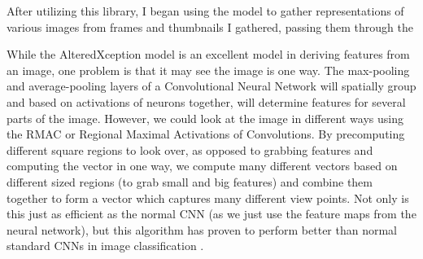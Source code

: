 \documentclass[10pt,twocolumn]{article}
\begin{document}
After utilizing this library, I began using the model to gather representations of various images from frames and thumbnails I gathered, passing them through the 


 
While the AlteredXception model is an excellent model in deriving features from an image, one problem is that it may see the image is one way. The max-pooling and average-pooling layers of a Convolutional Neural Network will spatially group and based on activations of neurons together, will determine features for several parts of the image. However, we could look at the image in different ways using the RMAC or Regional Maximal Activations of Convolutions. By precomputing different square regions to look over, as opposed to grabbing features and computing the vector in one way, we compute many different vectors based on different sized regions (to grab small and big features) and combine them together to form a vector which captures many different view points. Not only is this just as efficient as the normal CNN (as we just use the feature maps from the neural network), but this algorithm has proven to perform better than normal standard CNNs in image classification \cite{}.
\end{document}
